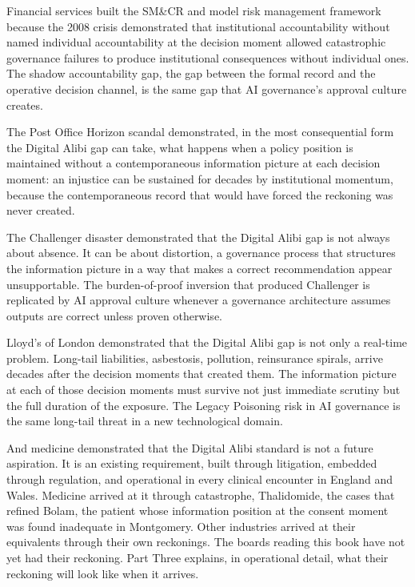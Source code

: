 Financial services built the SM\&CR and model risk management framework because the 2008 crisis demonstrated that institutional accountability without named individual accountability at the decision moment allowed catastrophic governance failures to produce institutional consequences without individual ones. The shadow accountability gap, the gap between the formal record and the operative decision channel, is the same gap that AI governance's approval culture creates.

The Post Office Horizon scandal demonstrated, in the most consequential form the Digital Alibi gap can take, what happens when a policy position is maintained without a contemporaneous information picture at each decision moment: an injustice can be sustained for decades by institutional momentum, because the contemporaneous record that would have forced the reckoning was never created.

The Challenger disaster demonstrated that the Digital Alibi gap is not always about absence. It can be about distortion, a governance process that structures the information picture in a way that makes a correct recommendation appear unsupportable. The burden-of-proof inversion that produced Challenger is replicated by AI approval culture whenever a governance architecture assumes outputs are correct unless proven otherwise.

Lloyd's of London demonstrated that the Digital Alibi gap is not only a real-time problem. Long-tail liabilities, asbestosis, pollution, reinsurance spirals, arrive decades after the decision moments that created them. The information picture at each of those decision moments must survive not just immediate scrutiny but the full duration of the exposure. The Legacy Poisoning risk in AI governance is the same long-tail threat in a new technological domain.

And medicine demonstrated that the Digital Alibi standard is not a future aspiration. It is an existing requirement, built through litigation, embedded through regulation, and operational in every clinical encounter in England and Wales. Medicine arrived at it through catastrophe, Thalidomide, the cases that refined Bolam, the patient whose information position at the consent moment was found inadequate in Montgomery. Other industries arrived at their equivalents through their own reckonings. The boards reading this book have not yet had their reckoning. Part Three explains, in operational detail, what their reckoning will look like when it arrives.

